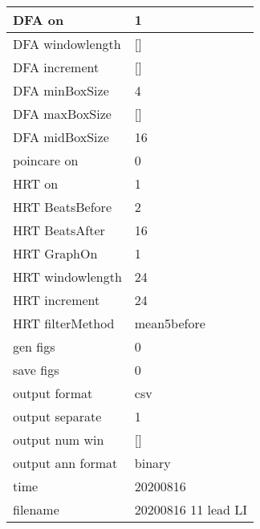 \begin{tabular}{|l|l|}
DFA on&1\\\hline
DFA windowlength&[]\\\hline
DFA increment&[]\\\hline
DFA minBoxSize&4\\\hline
DFA maxBoxSize&[]\\\hline
DFA midBoxSize&16\\\hline
poincare on&0\\\hline
HRT on&1\\\hline
HRT BeatsBefore&2\\\hline
HRT BeatsAfter&16\\\hline
HRT GraphOn&1\\\hline
HRT windowlength&24\\\hline
HRT increment&24\\\hline
HRT filterMethod&mean5before\\\hline
gen figs&0\\\hline
save figs&0\\\hline
output format&csv\\\hline
output separate&1\\\hline
output num win&[]\\\hline
output ann format&binary\\\hline
time&20200816\\\hline
filename&20200816 11 lead LI\\\hline
\end{tabular}

